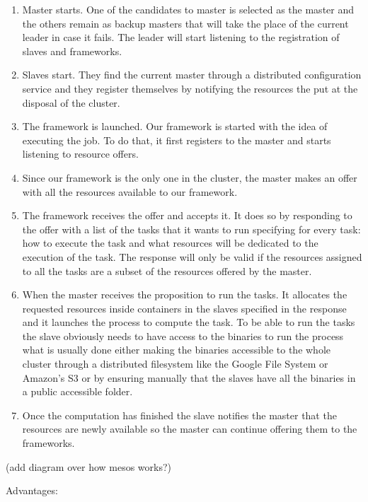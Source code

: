 \documentclass{svjour3}                     %
\begin{document}
\begin{enumerate}
\item Master starts. One of the candidates to master is selected as the master and 
the others remain as backup masters that will take the place of the current leader in
case it fails. The leader will start listening to the registration of slaves and 
frameworks.
\item Slaves start. They find the current master through a distributed configuration 
service and they register themselves by notifying the resources the put at the disposal
of the cluster.
\item The framework is launched. Our framework is started with the idea of executing 
the job. To do that, it first registers to the master and starts listening to resource
offers.
\item Since our framework is the only one in the cluster, the master makes an offer with
all the resources available to our framework.
\item The framework receives the offer and accepts it. It does so by responding to the
offer with a list of the tasks that it wants to run specifying for every task: how to 
execute the task and what resources will be dedicated to the execution of the task.
The response will only be valid if the resources assigned to all the tasks are a subset
of the resources offered by the master.
\item When the master receives the proposition to run the tasks. It allocates the requested
resources inside containers in the slaves specified in the response and it launches the
process to compute the task. To be able to run the tasks the slave obviously needs to 
have access to the binaries to run the process what is usually done either making the
binaries accessible to the whole cluster through a distributed filesystem like the Google File System \cite{ghemawat_google_2003}
or Amazon's S3 \cite{_aws_????} or by ensuring manually that the slaves have all the binaries in a public
accessible folder.
\item Once the computation has finished the slave notifies the master that the resources
are newly available so the master can continue offering them to the frameworks.
\end{enumerate}


(add diagram over how mesos works?)

Advantages:
\end{document}
